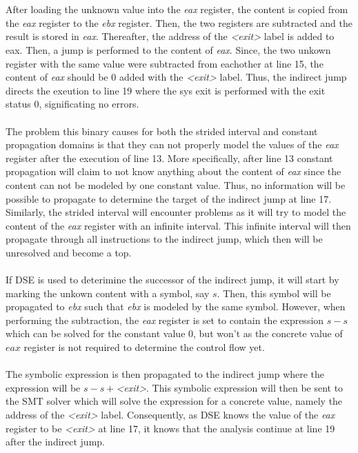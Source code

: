 \documentclass{kththesis}
\renewcommand{\it}[1]{\textit{#1}}
\begin{document}
\\ \\
After loading the unknown value into the \it{eax} register, the content is copied from the \it{eax} register to the \it{ebx} register. Then, the two registers are subtracted and the result is stored in \it{eax}. Thereafter, the address of the \it{<exit>} label is added to eax. Then, a jump is performed to the content of \it{eax}. Since, the two unkown register with the same value were subtracted from eachother at line 15, the content of \it{eax} should be $0$ added with the \it{<exit>} label. Thus, the indirect jump directs the exeution to line 19 where the sys exit is performed with the exit status $0$, significating no errors.
\\ \\
The problem this binary causes for both the strided interval and constant propagation domains is that they can not properly model the values of the \it{eax} register after the execution of line 13. More specifically, after line 13 constant propagation will claim to not know anything about the content of \it{eax} since the content can not be modeled by one constant value. Thus, no information will be possible to propagate to determine the target of the indirect jump at line 17. Similarly, the strided interval will encounter problems as it will try to model the content of the \it{eax} register with an infinite interval. This infinite interval will then propagate through all instructions to the indirect jump, which then will be unresolved and become a top.
\\ \\
If DSE is used to deterimine the successor of the indirect jump, it will start by marking the unkown content with a symbol, say $s$. Then, this symbol will be propagated to \it{ebx} such that \it{ebx} is modeled by the same symbol. However, when performing the subtraction, the \it{eax} register is set to contain the expression $s - s$ which can be solved for the constant value $0$, but won't as the concrete value of $eax$ register is not required to determine the control flow yet. 
\\ \\ 
The symbolic expression is then propagated to the indirect jump where the expression will be $s - s + $\it{<exit>}. This symbolic expression will then be sent to the SMT solver which will solve the expression for a concrete value, namely the address of the \it{<exit>} label. Consequently, as DSE knows the value of the \it{eax} register to be \it{<exit>} at line 17, it knows that the analysis continue at line 19 after the indirect jump. 
\end{document}
